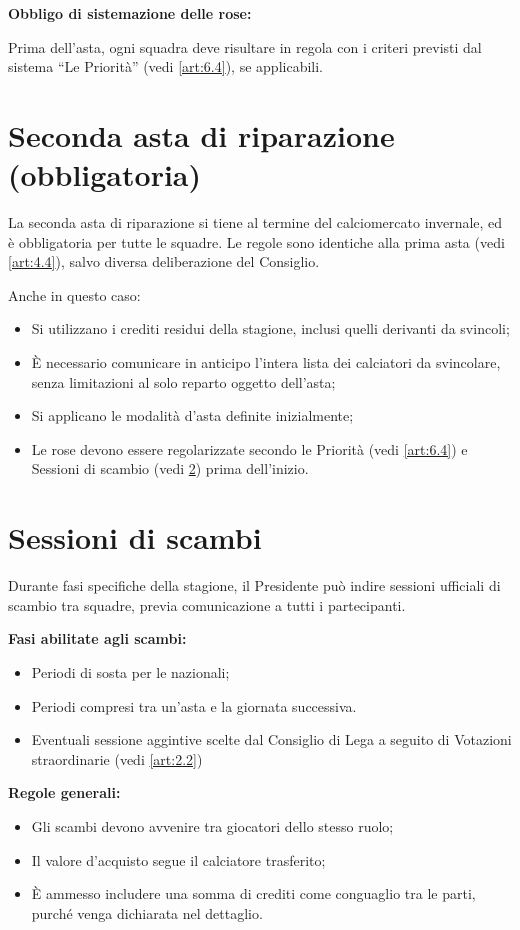 \noindent  \textbf{Obbligo di sistemazione delle rose:}

Prima dell'asta, ogni squadra deve risultare in regola con i criteri previsti dal sistema “Le Priorità” (vedi \ref{art:6.4}), se applicabili.

\section{Seconda asta di riparazione (obbligatoria)}
\label{art:6.2}

La seconda asta di riparazione si tiene al termine del calciomercato invernale, ed è obbligatoria per tutte le squadre. Le regole sono identiche alla prima asta (vedi \ref{art:4.4}), salvo diversa deliberazione del Consiglio.

\noindent
Anche in questo caso:
\begin{itemize}
\item Si utilizzano i crediti residui della stagione, inclusi quelli derivanti da svincoli;
\item È necessario comunicare in anticipo l'intera lista dei calciatori da svincolare, senza limitazioni al solo reparto oggetto dell'asta;
\item Si applicano le modalità d'asta definite inizialmente;
\item Le rose devono essere regolarizzate secondo le Priorità (vedi \ref{art:6.4}) e Sessioni di scambio (vedi \ref{art:6.3}) prima dell'inizio.
\end{itemize}

\section{Sessioni di scambi}
\label{art:6.3}

Durante fasi specifiche della stagione, il Presidente può indire sessioni ufficiali di scambio tra squadre, previa comunicazione a tutti i partecipanti.

\noindent \textbf{Fasi abilitate agli scambi:}
\begin{itemize}
\item Periodi di sosta per le nazionali;
\item Periodi compresi tra un'asta e la giornata successiva.
\item Eventuali sessione aggintive scelte dal Consiglio di Lega a seguito di Votazioni straordinarie (vedi \ref{art:2.2})
\end{itemize}

\noindent \textbf{Regole generali:}
\begin{itemize}
\item Gli scambi devono avvenire tra giocatori dello stesso ruolo;
\item Il valore d'acquisto segue il calciatore trasferito;
\item È ammesso includere una somma di crediti come conguaglio tra le parti, purché venga dichiarata nel dettaglio.
\end{itemize}

